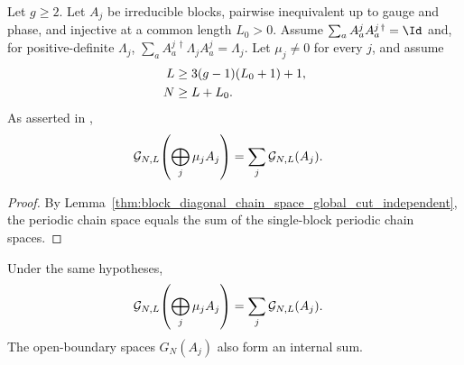 \begin{theorem}
    \label{thm:block_diagonal_chain_space_global_cut}
    \leanok
    Let $g\ge2$. Let $A_j$ be irreducible blocks, pairwise inequivalent up to
    gauge and phase, and injective at a common
    length $L_0>0$. Assume
    $\sum_aA^j_aA^{j\,\dagger}_a=\Id$ and, for positive-definite $\Lambda_j$,
    $\sum_aA^{j\,\dagger}_a\Lambda_jA^j_a=\Lambda_j$.
    Let $\mu_j\ne0$ for every $j$, and assume
    \begin{align}
        L
         & \ge3(g-1)(L_0+1)+1,
        \notag                 \\
        N
         & \ge L+L_0.
        \notag
    \end{align}
    As asserted in
    \cite[Theorem~12, proof lines~1424--1456]{PerezGarcia2007Matrix},
    \begin{align}
        \mathcal G_{N,L}\!\left(\bigoplus_j\mu_jA_j\right)
         & =
        \sum_j\mathcal G_{N,L}(A_j).
        \notag
    \end{align}
\end{theorem}

\begin{proof}
    \leanok
    By Lemma~\ref{thm:block_diagonal_chain_space_global_cut_independent},
    the periodic chain space equals the sum of the single-block periodic chain
    spaces.
\end{proof}

\begin{lemma}
    \label{thm:block_diagonal_chain_space_global_cut_independent}
    \leanok
    Under the same hypotheses,
    \begin{align}
        \mathcal G_{N,L}\!\left(\bigoplus_j\mu_jA_j\right)
         & =
        \sum_j\mathcal G_{N,L}(A_j).
        \notag
    \end{align}
    The open-boundary spaces $G_N(A_j)$ also form an internal sum.
\end{lemma}

